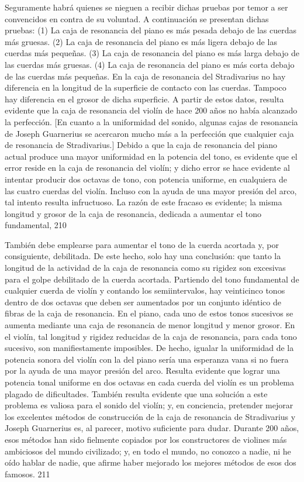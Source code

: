 Seguramente habrá quienes se nieguen a recibir dichas pruebas por temor a ser convencidos en contra de su voluntad.
A continuación se presentan dichas pruebas:
(1) La caja de resonancia del piano es más pesada debajo de las cuerdas más gruesas.
(2) La caja de resonancia del piano es más ligera debajo de las cuerdas más pequeñas.
(3) La caja de resonancia del piano es más larga debajo de las cuerdas más gruesas.
(4) La caja de resonancia del piano es más corta debajo de las cuerdas más pequeñas.
En la caja de resonancia del Stradivarius no hay diferencia en la longitud de la superficie de contacto con las cuerdas. Tampoco hay diferencia en el grosor de dicha superficie. A partir de estos datos, resulta evidente que la caja de resonancia del violín de hace 200 años no había alcanzado la perfección. [En cuanto a la uniformidad del sonido, algunas cajas de resonancia de Joseph Guarnerius se acercaron mucho más a la perfección que cualquier caja de resonancia de Stradivarius.]
Debido a que la caja de resonancia del piano actual produce una mayor uniformidad en la potencia del tono, es evidente que el error reside en la caja de resonancia del violín; y dicho error se hace evidente al intentar producir dos octavas de tono, con potencia uniforme, en cualquiera de las cuatro cuerdas del violín. Incluso con la ayuda de una mayor presión del arco, tal intento resulta infructuoso. La razón de este fracaso es evidente; la misma longitud y grosor de la caja de resonancia, dedicada a aumentar el tono fundamental,
210

También debe emplearse para aumentar el tono de la cuerda acortada y, por consiguiente, debilitada. De este hecho, solo hay una conclusión: que tanto la longitud de la actividad de la caja de resonancia como su rigidez son excesivas para el golpe debilitado de la cuerda acortada. Partiendo del tono fundamental de cualquier cuerda de violín y contando los semiintervalos, hay veinticinco tonos dentro de dos octavas que deben ser aumentados por un conjunto idéntico de fibras de la caja de resonancia. En el piano, cada uno de estos tonos sucesivos se aumenta mediante una caja de resonancia de menor longitud y menor grosor. En el violín, tal longitud y rigidez reducidas de la caja de resonancia, para cada tono sucesivo, son manifiestamente imposibles. De hecho, igualar la uniformidad de la potencia sonora del violín con la del piano sería una esperanza vana si no fuera por la ayuda de una mayor presión del arco.
Resulta evidente que lograr una potencia tonal uniforme en dos octavas en cada cuerda del violín es un problema plagado de dificultades. También resulta evidente que una solución a este problema es valiosa para el sonido del violín; y, en conciencia, pretender mejorar los excelentes métodos de construcción de la caja de resonancia de Stradivarius y Joseph Guarnerius es, al parecer, motivo suficiente para dudar. Durante 200 años, esos métodos han sido fielmente copiados por los constructores de violines más ambiciosos del mundo civilizado; y, en todo el mundo, no conozco a nadie, ni he oído hablar de nadie, que afirme haber mejorado los mejores métodos de esos dos famosos.
211

